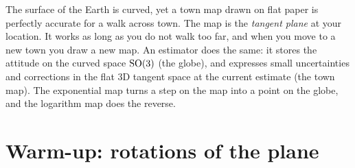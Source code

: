 \begin{keyidea}
The surface of the Earth is curved, yet a town map drawn on flat paper is perfectly accurate for a
walk across town. The map is the \emph{tangent plane} at your location. It works as long as you do
not walk too far, and when you move to a new town you draw a new map. An estimator does the same:
it stores the attitude on the curved space $\mathrm{SO}(3)$ (the globe), and expresses small uncertainties and
corrections in the flat 3D tangent space at the current estimate (the town map). The exponential
map turns a step on the map into a point on the globe, and the logarithm map does the reverse.
\end{keyidea}

\section{Warm-up: rotations of the plane}
\label{sec:so2}

